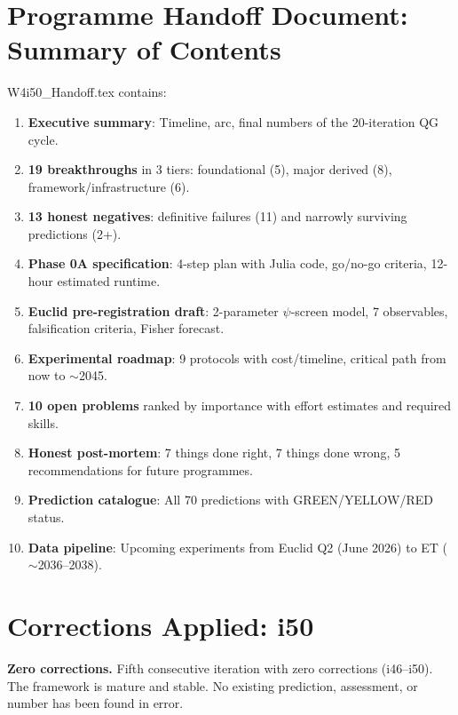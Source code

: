 \documentclass[11pt,a4paper]{article}
\begin{document}
\part{Programme Handoff Document: Summary of Contents}

W4i50\_Handoff.tex contains:

\begin{enumerate}
\item \textbf{Executive summary}: Timeline, arc, final numbers of the 20-iteration QG cycle.
\item \textbf{19 breakthroughs} in 3 tiers: foundational (5), major derived (8), framework/infrastructure (6).
\item \textbf{13 honest negatives}: definitive failures (11) and narrowly surviving predictions (2+).
\item \textbf{Phase 0A specification}: 4-step plan with Julia code, go/no-go criteria, 12-hour estimated runtime.
\item \textbf{Euclid pre-registration draft}: 2-parameter $\psi$-screen model, 7 observables, falsification criteria, Fisher forecast.
\item \textbf{Experimental roadmap}: 9 protocols with cost/timeline, critical path from now to $\sim$2045.
\item \textbf{10 open problems} ranked by importance with effort estimates and required skills.
\item \textbf{Honest post-mortem}: 7 things done right, 7 things done wrong, 5 recommendations for future programmes.
\item \textbf{Prediction catalogue}: All 70 predictions with GREEN/YELLOW/RED status.
\item \textbf{Data pipeline}: Upcoming experiments from Euclid Q2 (June 2026) to ET ($\sim$2036--2038).
\end{enumerate}


\part{Corrections Applied: i50}

\textbf{Zero corrections.} Fifth consecutive iteration with zero corrections (i46--i50). The framework is mature and stable. No existing prediction, assessment, or number has been found in error.
\end{document}

